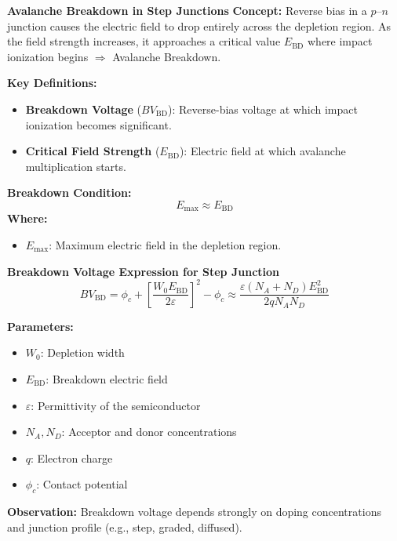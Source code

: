\begin{frame}{\textbf{Avalanche Breakdown in Step Junctions}}
    \textbf{Concept:} Reverse bias in a $p$–$n$ junction causes the electric field to drop entirely across the depletion region. As the field strength increases, it approaches a critical value $E_{\text{BD}}$ where impact ionization begins $\Rightarrow$ Avalanche Breakdown.
    
    \vspace{0.3em}
    \textbf{Key Definitions:}
    \begin{itemize}
        \item \textbf{Breakdown Voltage} ($BV_{\text{BD}}$): Reverse-bias voltage at which impact ionization becomes significant.
        \item \textbf{Critical Field Strength} ($E_{\text{BD}}$): Electric field at which avalanche multiplication starts.
    \end{itemize}
    
    \vspace{0.3em}
    \textbf{Breakdown Condition:}
    \begin{equation}
        E_{\max} \approx E_{\text{BD}}
    \end{equation}
    \textbf{Where:}
    \begin{itemize}
        \item $E_{\max}$: Maximum electric field in the depletion region.
    \end{itemize}
\end{frame}
    
\begin{frame}{\textbf{Breakdown Voltage Expression for Step Junction}}
    \begin{equation}
    BV_{\text{BD}} = \phi_c + \left[ \frac{W_0 E_{\text{BD}}}{2 \varepsilon} \right]^2 - \phi_c \approx \frac{\varepsilon (N_A + N_D) E_{\text{BD}}^2}{2 q N_A N_D}
    \end{equation}
    
    \textbf{Parameters:}
    \begin{itemize}
        \item $W_0$: Depletion width
        \item $E_{\text{BD}}$: Breakdown electric field
        \item $\varepsilon$: Permittivity of the semiconductor
        \item $N_A, N_D$: Acceptor and donor concentrations
        \item $q$: Electron charge
        \item $\phi_c$: Contact potential
    \end{itemize}
    
    \vspace{0.3em}
    \textbf{Observation:} Breakdown voltage depends strongly on doping concentrations and junction profile (e.g., step, graded, diffused).
\end{frame}


